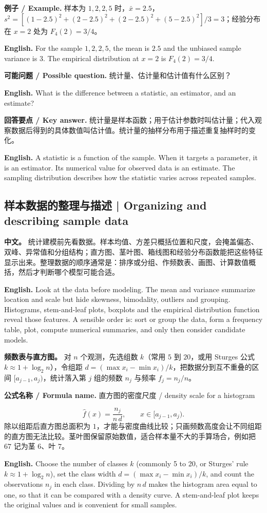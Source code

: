 \documentclass[UTF8,11pt,a4paper]{ctexart}
\newcommand{\EN}[1]{\par\noindent\textbf{English.} #1\par}
\newcommand{\FORMULA}[2]{\par\noindent\textbf{公式名称 / Formula name.} #1 / #2\par}
\newcommand{\EX}[2]{\par\noindent\textbf{例子 / Example.} #1\par\EN{#2}}
\newcommand{\ASK}[4]{\par\noindent\textbf{可能问题 / Possible question.} #1\par\EN{#2}\noindent\textbf{回答要点 / Key answer.} #3\par\EN{#4}\medskip}
\newcommand{\APS}[2]{\par\noindent\textbf{中文。} #1\par\noindent\textbf{English.} #2\par\smallskip}
\begin{document}
\EX{样本为 $1,2,2,5$ 时，$\bar x=2.5$，$s^2=[(1-2.5)^2+(2-2.5)^2+(2-2.5)^2+(5-2.5)^2]/3=3$；经验分布在 $x=2$ 处为 $F_4(2)=3/4$。}{For the sample $1,2,2,5$, the mean is $2.5$ and the unbiased sample variance is $3$. The empirical distribution at $x=2$ is $F_4(2)=3/4$.}

\ASK{统计量、估计量和估计值有什么区别？}{What is the difference between a statistic, an estimator, and an estimate?}{统计量是样本函数；用于估计参数时叫估计量；代入观察数据后得到的具体数值叫估计值。统计量的抽样分布用于描述重复抽样时的变化。}{A statistic is a function of the sample. When it targets a parameter, it is an estimator. Its numerical value for observed data is an estimate. The sampling distribution describes how the statistic varies across repeated samples.}

\subsection{样本数据的整理与描述 | Organizing and describing sample data}
\APS{统计建模前先看数据。样本均值、方差只概括位置和尺度，会掩盖偏态、双峰、异常值和分组结构；直方图、茎叶图、箱线图和经验分布函数能把这些特征显示出来。整理数据的顺序通常是：排序或分组、作频数表、画图、计算数值概括，然后才判断哪个模型可能合适。}{Look at the data before modeling. The mean and variance summarize location and scale but hide skewness, bimodality, outliers and grouping. Histograms, stem-and-leaf plots, boxplots and the empirical distribution function reveal those features. A sensible order is: sort or group the data, form a frequency table, plot, compute numerical summaries, and only then consider candidate models.}

\noindent\textbf{频数表与直方图。} 对 $n$ 个观测，先选组数 $k$（常用 $5$ 到 $20$，或用 Sturges 公式 $k\approx1+\log_2n$），令组距 $d=(\max x_i-\min x_i)/k$，把数据分到互不重叠的区间 $[a_{j-1},a_j)$，统计落入第 $j$ 组的频数 $n_j$ 与频率 $f_j=n_j/n$。
\FORMULA{直方图的密度尺度}{density scale for a histogram}
\[
\hat f(x)=\frac{n_j}{n\,d},\qquad x\in[a_{j-1},a_j).
\]
除以组距后直方图总面积为 $1$，才能与密度曲线比较；只画频数高度会让不同组距的直方图无法比较。茎叶图保留原始数值，适合样本量不大的手算场合，例如把 $67$ 记为茎 $6$、叶 $7$。
\EN{Choose the number of classes $k$ (commonly 5 to 20, or Sturges' rule $k\approx1+\log_2n$), set the class width $d=(\max x_i-\min x_i)/k$, and count the observations $n_j$ in each class. Dividing by $n\,d$ makes the histogram area equal to one, so that it can be compared with a density curve. A stem-and-leaf plot keeps the original values and is convenient for small samples.}
\end{document}

